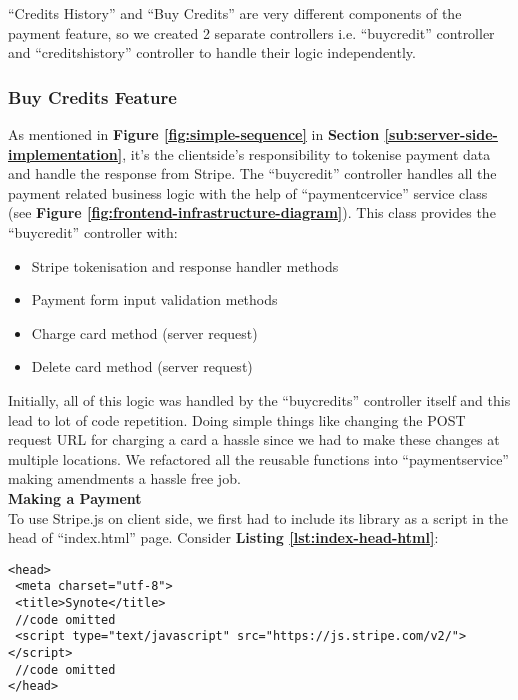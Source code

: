 “Credits History” and “Buy Credits” are very different components of the payment feature, so we created 2 separate controllers i.e. “buycredit” controller and “creditshistory” controller to handle their logic independently.\\  

\subsubsection{Buy Credits Feature}
\label{subsubsec:buy-credits-feature}

As mentioned in \textbf{Figure \ref{fig:simple-sequence}} in \textbf{Section \ref{sub:server-side-implementation}}, it’s the clientside’s responsibility to tokenise payment data and handle the response from Stripe. The “buycredit” controller handles all the payment related business logic with the help of “paymentcervice” service class (see \textbf{Figure \ref{fig:frontend-infrastructure-diagram}}). This class provides the “buycredit” controller with:

\begin{itemize}
\item Stripe tokenisation and response handler methods
\item Payment form input validation methods
\item Charge card method (server request) 
\item Delete card method (server request)
\end{itemize}

Initially, all of this logic was handled by the “buycredits” controller itself and this lead to lot of code repetition. Doing simple things like changing the POST request URL for charging a card a hassle since we had to make these changes at multiple locations. We refactored all the reusable functions into “paymentservice” making amendments a hassle free job. \\

\textbf{Making a Payment}\\
To use Stripe.js on client side, we first had to include its library as a script in the head of “index.html” page. Consider \textbf{Listing \ref{lst:index-head-html}}:\\

\begin{listing}[H]
\begin{verbatim}
<head>
 <meta charset="utf-8">
 <title>Synote</title>
 //code omitted
 <script type="text/javascript" src="https://js.stripe.com/v2/"></script>
 //code omitted
</head>
\end{verbatim}
\label{lst:index-head-html}
\end{listing}


